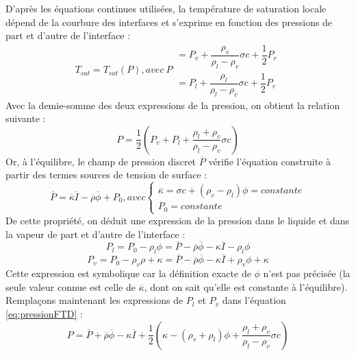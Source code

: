 D'apr\`es les \'equations continues utilis\'ees, la temp\'erature de saturation locale d\'epend de la courbure des interfaces et s'exprime en fonction des pressions de part et d'autre de l'interface :
\begin{equation}
T_{sat} = T_{sat}(P), avec \:P \begin{array}{rcl} = P_{v} + \dfrac{\rho_{v}}{\rho_{l} - \rho_{v}} \sigma c + \dfrac{1}{2} P_{r}\\
 = P_{l} + \dfrac{\rho_{l}}{\rho_{l} - \rho_{v}} \sigma c + \dfrac{1}{2} P_{r}\end{array}
\end{equation}
Avec la demie-somme des deux expressions de la pression, on obtient la relation
suivante :
\begin{equation}
P = \dfrac{1}{2} \left( P_{v} + P_{l} + \dfrac{\rho_{l} + \rho_{v}}{\rho_{l} - \rho_{v}} \sigma c\right) \label{eq:pressionFTD}
\end{equation}
Or, \`a l'\'equilibre, le champ de pression discret $\overline{P}$ v\'erifie l'\'equation construite \`a partir des termes sources de tension de surface :
\begin{equation}
\overline{P} = \overline{\kappa} \overline{I} - \overline{\rho} \overline{\phi} + P_{0}, avec \left\{ \begin{array}{rcl}
\overline{\kappa} = \sigma c + (\rho_{v} - \rho_{l})\phi = constante\\
P_{0} = constante
\end{array}\right.
\end{equation}
De cette propri\'et\'e, on d\'eduit une expression de la pression dans le liquide et dans la vapeur de part et d'autre de l'interface :
\begin{equation}
P_{l} = P_{0} - \rho_{l}\phi = \overline{P} - \overline{\rho}\overline{\phi} - \kappa\overline{I} - \rho_{l}\phi
\end{equation}
\begin{equation}
P_{v} = P_{0} - \rho_{v}\rho + \kappa = \overline{P} - \overline{\rho}\overline{\phi} - \kappa\overline{I} + \rho_{v}\phi + \kappa
\end{equation}
Cette expression est symbolique car la d\'efinition exacte de $\phi$ n'est pas pr\'ecis\'ee (la seule valeur connue est celle de $\overline{\kappa}$, dont on sait qu'elle est constante \`a l'\'equilibre). Rempla\c cons maintenant les
expressions de $P_{l}$ et $P_{v}$ dans l'\'equation \ref{eq:pressionFTD} :
\begin{equation}
P = \overline{P} + \overline{\rho}\overline{\phi} - \kappa\overline{I} + \dfrac{1}{2} \left( \kappa - (\rho_{v} + \rho_{l})\phi + \dfrac{\rho_{l}+\rho_{v}}{\rho_{l}-\rho_{v}} \sigma c\right) 
\end{equation}
